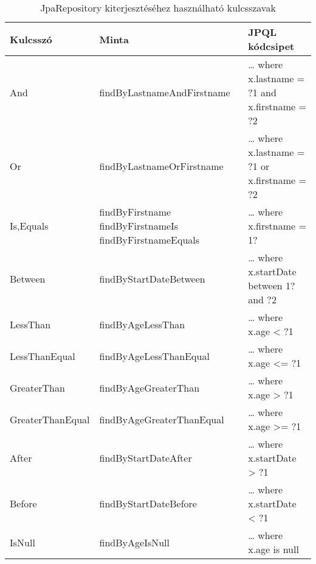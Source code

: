 
	
	\footnotesize
	\begin{longtable}{| p{.20\linewidth} | p{.30\linewidth} | p{.50\linewidth } |}		
			\caption{JpaRepository kiterjesztéséhez  használható kulcsszavak}
			\label{tab:JpaRepository} \\
			\hline
			Kulcsszó & Minta & JPQL kódcsipet \\ 
			\hline
			And &	findByLastnameAndFirstname	& … where x.lastname = ?1 and x.firstname = ?2 \\
			\hline
			Or &	findByLastnameOrFirstname	& … where x.lastname = ?1 or x.firstname = ?2 \\
			\hline
			Is,Equals &	findByFirstname \linebreak findByFirstnameIs \linebreak findByFirstnameEquals	& … where x.firstname = 1? \\
			\hline
			Between &	findByStartDateBetween	& … where x.startDate between 1? and ?2 \\
			\hline
			LessThan &	findByAgeLessThan	& … where x.age < ?1 \\
			\hline
			LessThanEqual &	findByAgeLessThanEqual	& … where x.age <= ?1 \\
			\hline
			GreaterThan &	findByAgeGreaterThan	& … where x.age > ?1 \\
			\hline
			GreaterThanEqual &	findByAgeGreaterThanEqual	& … where x.age >= ?1 \\
			\hline
			After &	findByStartDateAfter	& … where x.startDate > ?1 \\
			\hline
			Before &	findByStartDateBefore	& … where x.startDate < ?1 \\
			\hline
			IsNull &	findByAgeIsNull	& … where x.age is null \\

\end{longtable}
